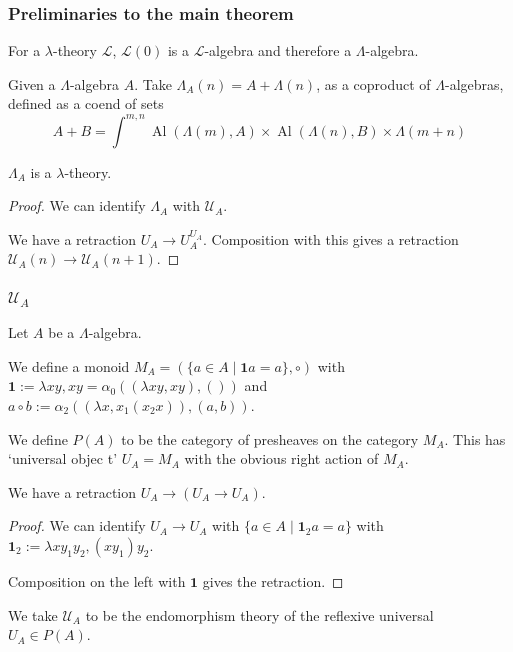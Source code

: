 \documentclass[aspectratio=169]{fancyslides} %
\begin{document}
  \begin{frame}
    \frametitle{Preliminaries to the main theorem}

    For a $ \lambda $-theory $ \mathcal L $, $ \mathcal L(0) $ is a $ \mathcal L $-algebra and therefore a $ \Lambda $-algebra.

    \vfill
    \pause

    Given a $ \Lambda $-algebra $ A $. Take $ \Lambda_A(n) = A + \Lambda(n) $, as a coproduct of $ \Lambda $-algebras, defined as a coend of sets
    \[ A + B = \int^{m, n} \mathop{Alg_\Lambda}(\Lambda(m), A) \times \mathop{Alg_\Lambda}(\Lambda(n), B) \times \Lambda (m + n) \]

    \vfill
    \pause

    \begin{lemma}
      $ \Lambda_A $ is a $ \lambda $-theory.
    \end{lemma}
    \begin{proof}
      We can identify $ \Lambda_A $ with $ \mathcal U_A $.

      We have a retraction $ U_A \to U_A^{U_A} $. Composition with this gives a retraction $ \mathcal U_A(n) \to \mathcal U_A(n + 1) $.
    \end{proof}
  \end{frame}

  \begin{frame}
    \frametitle{$ \mathcal U_A $}
    Let $ A $ be a $ \Lambda $-algebra.

    \begin{definition}
      We define a monoid $ M_A = (\{ a \in A \mid \mathbf 1 a = a \}, \circ) $ with $ \mathbf 1 := \lambda x y, x y = \alpha_0((\lambda x y, x y), ()) $ and $ a \circ b := \alpha_2((\lambda x, x_1 (x_2 x)), (a, b)) $.
    \end{definition}

    \pause
    \vfill

    \begin{definition}
      We define $ P(A) $ to be the category of presheaves on the category $ M_A $. This has `universal objec t' $ U_A = M_A $ with the obvious right action of $ M_A $.
    \end{definition}

    \pause
    \vfill

    \begin{lemma}
      We have a retraction $ U_A \to (U_A \to U_A) $.
    \end{lemma}
    \begin{proof}
      We can identify $ U_A \to U_A $ with $ \{ a \in A \mid \mathbf 1_2 a = a \} $ with $ \mathbf 1_2 := \lambda x y_1 y_2, (x y_1) y_2 $.

      Composition on the left with $ \mathbf 1 $ gives the retraction.
    \end{proof}

    \pause
    \vfill

    \begin{definition}
      We take $ \mathcal U_A $ to be the endomorphism theory of the reflexive universal $ U_A \in P(A) $.
    \end{definition}
  \end{frame}
\end{document}
